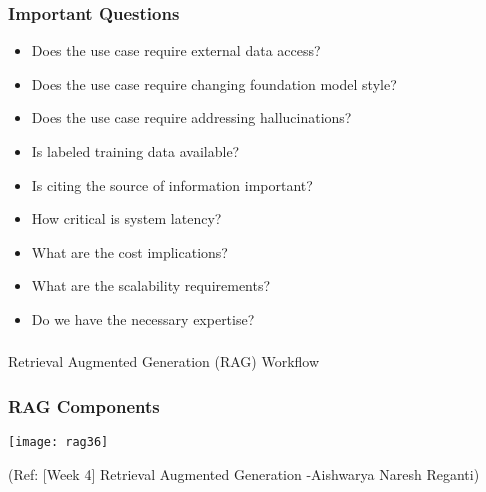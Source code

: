\begin{frame}[fragile]\frametitle{Important Questions}
\begin{itemize}
  \item Does the use case require external data access?
  \item Does the use case require changing foundation model style?
  \item Does the use case require addressing hallucinations?
  \item Is labeled training data available?
  \item Is citing the source of information important?
  \item How critical is system latency?
  \item What are the cost implications?
  \item What are the scalability requirements?
  \item Do we have the necessary expertise?
\end{itemize}
\end{frame}



\begin{frame}[fragile]\frametitle{}
\begin{center}
{\Large Retrieval Augmented Generation (RAG) Workflow}
\end{center}
\end{frame}

\begin{frame}[fragile]\frametitle{RAG Components}


		\begin{center}
		\texttt{[image: rag36]}
		\end{center}

{\tiny (Ref: [Week 4] Retrieval Augmented Generation -Aishwarya Naresh Reganti)}

\end{frame}

